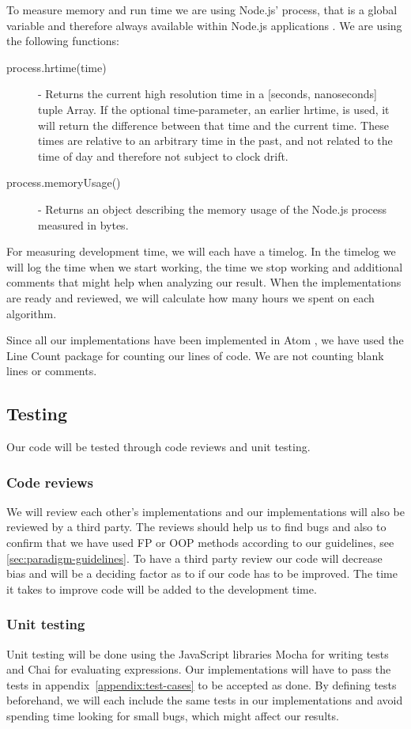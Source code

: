 \documentclass {article}
\begin{document}
To measure memory and run time we are using Node.js' process, that is a global variable and therefore always available within Node.js applications \cite{nodejs}. We are using the following functions:
\begin{description}
\item [process.hrtime(time)] - Returns the current high resolution time in a [seconds, nanoseconds] tuple Array. If the optional time-parameter, an earlier hrtime, is used, it will return the difference between that time and the current time. These times are relative to an arbitrary time in the past, and not related to the time of day and therefore not subject to clock drift.
\item [process.memoryUsage()] - Returns an object describing the memory usage of the Node.js process measured in bytes.
\end{description}
 
For measuring development time, we will each have a timelog. In the timelog we will log the time when we start working, the time we stop working and additional comments that might help when analyzing our result. When the implementations are ready and reviewed, we will calculate how many hours we spent on each algorithm.
 
Since all our implementations have been implemented in Atom \cite{atom}, we have used the Line Count package \cite{line-count} for counting our lines of code. We are not counting blank lines or comments.
\subsection{Testing}
Our code will be tested through code reviews and unit testing.
\subsubsection{Code reviews}
We will review each other's implementations and our implementations will also be reviewed by a third party. The reviews should help us to find bugs and also to confirm that we have used FP or OOP methods according to our guidelines, see \ref{sec:paradigm-guidelines}. To have a third party review our code will decrease bias and will be a deciding factor as to if our code has to be improved. The time it takes to improve code will be added to the development time.
\subsubsection{Unit testing}
Unit testing will be done using the JavaScript libraries Mocha \cite{mocha} for writing tests and Chai \cite{chai} for evaluating expressions. Our implementations will have to pass the tests in appendix~\ref{appendix:test-cases} to be accepted as done. By defining tests beforehand, we will each include the same tests in our implementations and avoid spending time looking for small bugs, which might affect our results.
\end{document}
